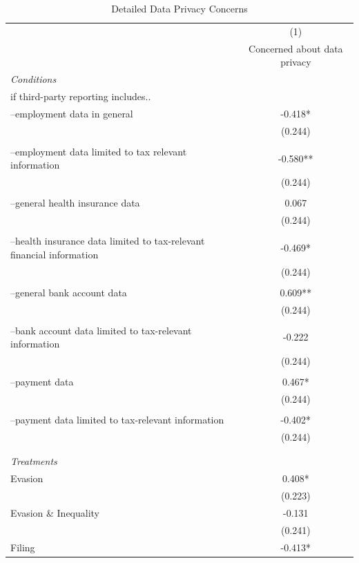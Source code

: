 \documentclass[11pt]{article}
\begin{document}
\FloatBarrier
\begin{table}[!htbp]\centering
\caption{Detailed Data Privacy Concerns}
\label{tab:detaileddataprivacy_c}
\begin{threeparttable}
\footnotesize
\begin{tabular}{l|c}
\toprule
 & (1)\\
 & Concerned about data privacy \\
\midrule
\textit{Conditions} \\[0.25em]
if third-party reporting includes.. \\[0.25em]
--employment data in general & -0.418* \\
 & (0.244) \\\\[0.25em]
--employment data limited to tax relevant information & -0.580** \\
 & (0.244) \\\\[0.25em]
--general health insurance data & 0.067 \\
 & (0.244) \\\\[0.25em]
--health insurance data limited to tax-relevant financial information & -0.469* \\
 & (0.244) \\\\[0.25em]
--general bank account data & 0.609** \\
 & (0.244) \\\\[0.25em]
--bank account data limited to tax-relevant information & -0.222 \\
 & (0.244) \\\\[0.25em]
--payment data & 0.467* \\
 & (0.244) \\\\[0.25em]
--payment data limited to tax-relevant information & -0.402* \\
 & (0.244) \\\\[0.25em]
\\[1em]
\textit{Treatments} \\[0.25em]
Evasion & 0.408* \\
 & (0.223) \\
Evasion \& Inequality & -0.131 \\
 & (0.241) \\
Filing & -0.413* \\

\end{tabular}
\end{threeparttable}
\end{table}
\end{document}
